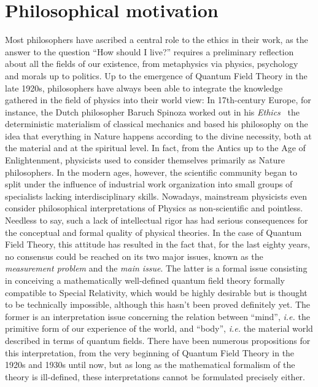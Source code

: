 \section*{Philosophical motivation}

Most philosophers have ascribed a central role to the ethics in their work, as the answer to the question ``How should I live?'' requires a preliminary reflection about all the fields of our existence, from metaphysics via physics, psychology and morals up to politics.
Up to the emergence of Quantum Field Theory in the late 1920s, philosophers have always been able to integrate the knowledge gathered in the field of physics into their world view: In 17th-century Europe, for instance, the Dutch philosopher Baruch Spinoza worked out in his \textit{Ethics}~\cite{Spinoza1677} the deterministic materialism of classical mechanics and based his philosophy on the idea that everything in Nature happens according to the divine necessity, both at the material and at the spiritual level.
In fact, from the Antics up to the Age of Enlightenment, physicists used to consider themselves primarily as Nature philosophers.
In the modern ages, however, the scientific community began to split under the influence of industrial work organization into small groups of specialists lacking interdisciplinary skills.
Nowadays, mainstream physicists even consider philosophical interpretations of Physics as non-scientific and pointless.
Needless to say, such a lack of intellectual rigor has had serious consequences for the conceptual and formal quality of physical theories.
In the case of Quantum Field Theory, this attitude has resulted in the fact that, for the last eighty years, no consensus could be reached on its two major issues, known as the \textit{measurement problem} and the \textit{main issue}.
The latter is a formal issue consisting in conceiving a mathematically well-defined quantum field theory formally compatible to Special Relativity\footnotemark[1], which would be highly desirable but is thought to be technically impossible, although this hasn't been proved definitely yet.
The former is an interpretation issue concerning the relation between ``mind'', \textit{i.e.} the primitive form of our experience of the world, and ``body'', \textit{i.e.} the material world described in terms of quantum fields.
There have been numerous propositions for this interpretation, from the very beginning of Quantum Field Theory in the 1920s and 1930s until now, but as long as the mathematical formalism of the theory is ill-defined, these interpretations cannot be formulated precisely either.
